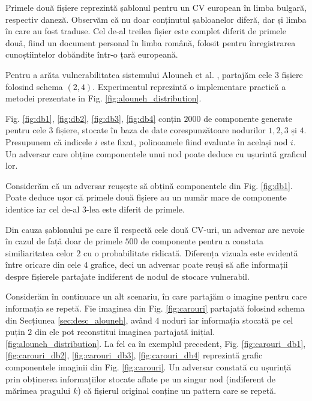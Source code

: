 \documentclass[oneside, 12pt]{book}
\begin{document}
Primele două fișiere reprezintă șablonul pentru un CV european în limba bulgară, respectiv daneză. Observăm că nu doar conținutul șabloanelor diferă, dar și limba în care au fost traduse. Cel de-al treilea fișier este complet diferit de primele două, fiind un document personal în limba română, folosit pentru înregistrarea cunoștiintelor dobăndite într-o țară europeană.

Pentru a arăta vulnerabilitatea sistemului Alouneh et al. {\cite{AAMK:2013}}, partajăm cele $3$ fișiere folosind schema $(2, 4)$. Experimentul reprezintă o implementare practică a metodei prezentate in Fig. {\ref{fig:alouneh_distribution}}.

Fig. {\ref{fig:db1}}, {\ref{fig:db2}}, {\ref{fig:db3}}, {\ref{fig:db4}} conțin $2000$ de componente generate pentru cele $3$ fișiere, stocate în baza de date corespunzătoare nodurilor $1,2,3$ și $4$. Presupunem că indicele $i$ este fixat, polinoamele fiind evaluate în același nod $i$. Un adversar care obține componentele unui nod poate deduce cu ușurintă graficul lor.

Considerăm că un adversar reușește să obțină componentele din Fig. {\ref{fig:db1}}. Poate deduce ușor că primele două fișiere au un număr mare de componente identice iar cel de-al $3$-lea este diferit de primele.

Din cauza șablonului pe care îl respectă cele două CV-uri, un adversar are nevoie în cazul de față doar de primele $500$ de componente pentru a constata similiaritatea celor $2$ cu o probabilitate ridicată.
Diferența vizuala este evidentă între oricare din cele $4$ grafice, deci un adversar poate reuși să afle informații despre fișierele partajate indiferent de nodul de stocare vulnerabil.

Considerăm în continuare un alt scenariu, în care partajăm o imagine pentru care informația se repetă. Fie imaginea din Fig. {\ref{fig:carouri}} partajată folosind schema din Secțiunea {\ref{sec:desc_alouneh}}, având $4$ noduri iar informația stocată pe cel puțin $2$ din ele pot reconstitui imaginea partajată inițial. {\ref{fig:alouneh_distribution}}. La fel ca în exemplul precedent, Fig. {\ref{fig:carouri_db1}, \ref{fig:carouri_db2}, \ref{fig:carouri_db3}, \ref{fig:carouri_db4}} reprezintă grafic componentele imaginii din Fig. {\ref{fig:carouri}}. Un adversar constată cu ușurință prin obținerea informațiilor stocate aflate pe un singur nod (indiferent de mărimea pragului $k$) că fișierul original conține un pattern care se repetă.
\end{document}
